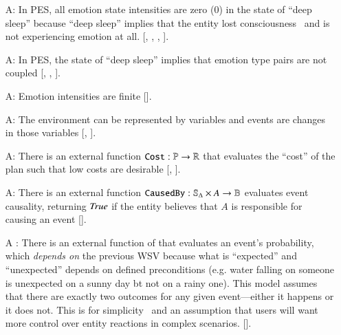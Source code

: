 \begin{itemize}
    \item[A\refstepcounter{assumpnum}\theassumpnum \label{A_PositiveIntensity}:]
    In PES, all emotion state intensities are zero (0) in the state of ``deep
    sleep'' because ``deep sleep'' implies that the entity lost
    consciousness~\citep[p.~1--2]{mondino2021definitions} and is not
    experiencing emotion at all. [,
    , ,
    ].

    \item[A\refstepcounter{assumpnum}\theassumpnum \label{A_EmotionPairs}:] In
    PES, the state of ``deep sleep'' implies that emotion type pairs are not
    coupled [, ,
    ].

    \item[A\refstepcounter{assumpnum}\theassumpnum \label{A_LimitIntensity}:]
    Emotion intensities are finite [].

    \item[A\refstepcounter{assumpnum}\theassumpnum \label{A_Events}:]
    The environment can be represented by variables and events are changes in
    those variables [, ].

    \item[A\refstepcounter{assumpnum}\theassumpnum \label{A_CostFunction}:]
    There is an external function $\mathtt{Cost} : \mathbb{P} \rightarrow
    \mathbb{R}$ that evaluates the ``cost'' of the plan such that low costs are
    desirable [, ].

    \item[A\refstepcounter{assumpnum}\theassumpnum \label{A_CausedByFunction}:]
    There is an external function $\mathtt{CausedBy} : \mathbb{S}_{\Delta}
    \times A \rightarrow \mathbb{B}$ evaluates event causality, returning
    $\mathit{True}$ if the entity believes that $A$ is responsible for causing an event
    [].

    \item[A\refstepcounter{assumpnum}\theassumpnum
    \label{A_EventProbabilityFunction}:]
    There is an external function of that evaluates an event's probability,
    which \textit{depends on} the previous WSV because what is ``expected'' and
    ``unexpected'' depends on defined preconditions (e.g. water falling on
    someone is unexpected on a sunny day bt not on a rainy one). This model
    assumes that there are exactly two outcomes for any given event---either it
    happens or it does not. This is for
    simplicity~\citep[p.~56]{reisenzein2019cognitive} and an assumption that
    users will want more control over entity reactions in complex scenarios.
    [].


\end{itemize}
